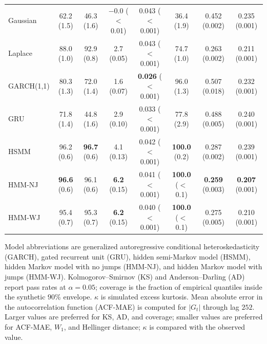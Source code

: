 \begin{table}[H]
{\begin{tabular}{@{}lccccccc@{}}
Gaussian  & 62.2 (1.5) & 46.3 (1.6) & $-$0.0 ($<$0.01) & 0.043 ($<$0.001) & 36.4 (1.9) & 0.452 (0.002) & 0.235 (0.001) \\
Laplace   & 88.0 (1.0) & 92.9 (0.8) & 2.7 (0.05) & 0.043 ($<$0.001) & 74.7 (1.0) & 0.263 (0.002) & 0.211 (0.001) \\
GARCH(1,1) & 80.3 (1.3) & 72.0 (1.4) & 1.6 (0.07) & \textbf{0.026} ($<$0.001) & 96.0 (1.3) & 0.507 (0.018) & 0.232 (0.001) \\
GRU       & 71.8 (1.4) & 44.8 (1.6) & 2.9 (0.10) & 0.033 ($<$0.001) & 77.8 (2.9) & 0.488 (0.005) & 0.240 (0.001) \\
HSMM      & 96.2 (0.6) & \textbf{96.7} (0.6) & 4.1 (0.13) & 0.042 ($<$0.001) & \textbf{100.0} (0.2) & 0.287 (0.002) & 0.239 (0.001) \\
HMM-NJ    & \textbf{96.6} (0.6) & 96.1 (0.6) & \textbf{6.2} (0.15) & 0.041 ($<$0.001) & \textbf{100.0} ($<$0.1) & \textbf{0.259} (0.003) & \textbf{0.207} (0.001) \\
HMM-WJ    & 95.4 (0.7) & 95.3 (0.7) & \textbf{6.2} (0.15) & 0.040 ($<$0.001) & \textbf{100.0} ($<$0.1) & 0.275 (0.005) & 0.210 (0.001) \\
\bottomrule
\end{tabular}}
\vspace{3pt}

\parbox{0.98\textwidth}{\scriptsize
Model abbreviations are generalized autoregressive conditional heteroskedasticity
(GARCH), gated recurrent unit (GRU), hidden semi-Markov model (HSMM), hidden
Markov model with no jumps (HMM-NJ), and hidden Markov model with jumps
(HMM-WJ). Kolmogorov--Smirnov (KS) and Anderson--Darling (AD) report pass
rates at $\alpha=0.05$; coverage is the fraction
of empirical quantiles inside the synthetic $90\%$ envelope.
$\kappa$ is simulated excess kurtosis. Mean absolute error in the autocorrelation
function (ACF-MAE) is computed for
$|G_t|$ through lag $252$. Larger values are preferred for KS, AD,
and coverage; smaller values are preferred for ACF-MAE, $W_1$, and
Hellinger distance; $\kappa$ is compared with the observed value.}
\end{table}
